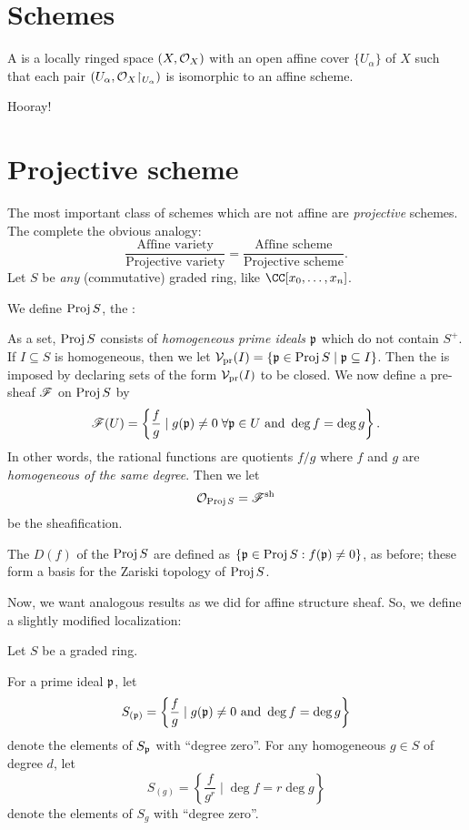 \documentclass[11pt]{scrreprt}
\begin{document}
\section{Schemes}
\begin{definition}
	A  is a locally ringed space $(X, \mathcal O_X)$
	with an open affine cover $\{U_\alpha\}$ of $X$
	such that each pair $(U_\alpha, \OO_X \restrict{U_\alpha})$
	is isomorphic to an affine scheme.
\end{definition}
Hooray!

\section{Projective scheme}
The most important class of schemes which are not affine are
\emph{projective} schemes.
The complete the obvious analogy:
\[
	\frac{\text{Affine variety}}{\text{Projective variety}}
	= 
	\frac{\text{Affine scheme}}{\text{Projective scheme}}.
\]
Let $S$ be \emph{any} (commutative) graded ring, like $\CC[x_0, \dots, x_n]$.
\begin{definition}
	We define $\operatorname{Proj} S$, the :
	\begin{itemize}
		\ii As a set, $\operatorname{Proj} S$ consists of \emph{homogeneous prime ideals}
		$\mathfrak p$ which do not contain $S^+$.
		\ii If $I \subseteq S$ is homogeneous, then
		we let $\mathcal V_{\text{pr}}(I) = \{ \mathfrak p \in \operatorname{Proj} S \mid \mathfrak p \subseteq I \}$.
		Then the  is imposed by declaring 
		sets of the form $\mathcal V_{\text{pr}}(I)$ to be closed.
		\ii We now define a pre-sheaf $\mathscr F$ on $\operatorname{Proj} S$ by
		\[ \mathscr F(U) = 
			\left\{ \frac{f}{g} \mid 
			g(\mathfrak p) \neq 0 \; \forall \mathfrak p \in U \text{ and }
			\deg f = \deg g \right\}.
		\]
		In other words, the rational functions are quotients $f/g$
		where $f$ and $g$ are \emph{homogeneous of the same degree}.
		Then we let \[ \mathcal O_{\operatorname{Proj} S} = \mathscr F^\mathrm{sh} \] be the sheafification.
	\end{itemize}
\end{definition}
\begin{definition}
	The  $D(f)$ of the $\operatorname{Proj} S$
	are defined as $\left\{ \mathfrak p \in \operatorname{Proj} S : f(\mathfrak p) \neq 0 \right\}$,
	as before; these form a basis for the Zariski topology of $\operatorname{Proj} S$.
\end{definition}
Now, we want analogous results as we did for affine structure sheaf.
So, we define a slightly modified localization:
\begin{definition}
	Let $S$ be a graded ring.
	\begin{enumerate}[(i)]
		\ii For a prime ideal $\mathfrak p$, let
		\[ S_{(\mathfrak p)} = \left\{ \frac fg \mid g(\mathfrak p) \neq 0 \text{ and }
			\deg f = \deg g \right\} \]
		denote the elements of $S_\mathfrak p$ with ``degree zero''.
		\ii For any homogeneous $g \in S$ of degree $d$, let
		\[ S_{(g)} = \left\{ \frac{f}{g^r} \mid 
			\deg f = r \deg g \right\} \]
		denote the elements of $S_g$ with ``degree zero''.
	\end{enumerate}
\end{definition}
\end{document}
